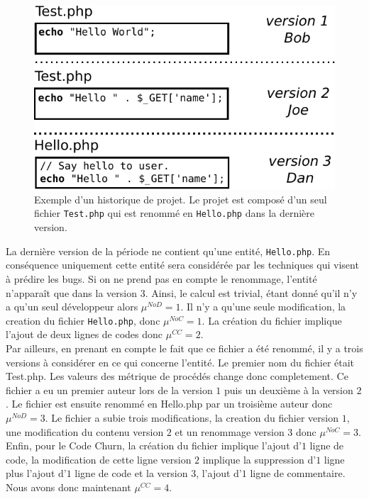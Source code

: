 \begin{figure}[t]
	\centering
	\includegraphics[width=0.8\linewidth,keepaspectratio]{data/figures/example.pdf}
	\caption{Exemple d'un historique de projet. Le projet est composé d'un seul fichier \texttt{Test.php} qui est renommé en \texttt{Hello.php} dans la dernière version.}
	\label{fig:example}
\end{figure}

La dernière version de la période ne contient qu'une entité, \texttt{Hello.php}. En conséquence uniquement cette entité sera considérée par les techniques qui visent à prédire les bugs. Si on ne prend pas en compte le renommage, l'entité n'apparaît que dans la version 3. Ainsi, le calcul est trivial, étant donné qu'il n'y a qu'un seul développeur alors $\mu^{NoD}=1$. Il n'y a qu'une seule modification, la creation du fichier \texttt{Hello.php}, donc $\mu^{NoC}=1$. La création du fichier implique l'ajout de deux lignes de codes donc $\mu^{CC}=2$.\\

Par ailleurs, en prenant en compte le fait que ce fichier a été renommé, il y a trois versions à considérer en ce qui concerne l'entité. Le premier nom du fichier était Test.php. Les valeurs des métrique de procédés change donc completement. Ce fichier a eu un premier auteur lors de la version $1$ puis un deuxième à la version $2$. Le fichier est ensuite renommé en Hello.php par un troisième auteur donc $\mu^{NoD}=3$. Le fichier a subie trois modifications, la creation du fichier version $1$, une modification du contenu version $2$ et un renommage version $3$ donc $\mu^{NoC}=3$. Enfin, pour le Code Churn, la création du fichier implique l'ajout d'$1$ ligne de code, la modification de cette ligne version $2$ implique la suppression d'$1$ ligne plus l'ajout d'$1$ ligne de code et la version 3, l'ajout d'$1$ ligne de commentaire. Nous avons donc maintenant $\mu^{CC}=4$. \\

